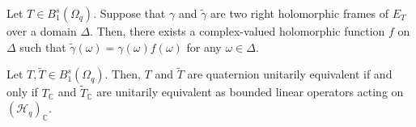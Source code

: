 \documentclass[10pt,a4paper]{amsart}
\begin{document}
    \begin{lemma}\label{FR}
 Let $T\in B_1^{s}(\Omega_q)$. Suppose that $\gamma$ and $\widetilde{\gamma}$ are two right holomorphic  frames  of $E_T$ over a domain $\Delta$. Then, there exists a complex-valued holomorphic function $f$ on $\Delta$ such that $\widetilde{\gamma}(\omega)=\gamma(\omega)f(\omega)$ for any $\omega\in\Delta$.
    \end{lemma}

\begin{theorem}
Let $T,\widetilde{T}\in B_1^{s}(\Omega_{q})$. Then,
$T$ and $\widetilde{T}$ are quaternion unitarily equivalent if and only if
$T_{\mathbb{C}}$ and $\widetilde{T}_{\mathbb{C}}$ are unitarily equivalent as bounded linear operators acting on $({\mathcal{H}_q})_\mathbb{C}$.
\end{theorem}
\end{document}
